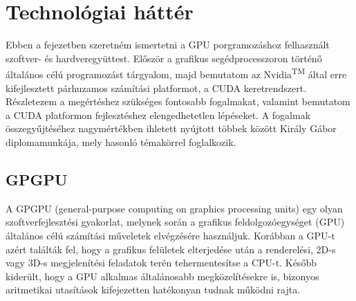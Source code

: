 \chapter{Technológiai háttér} \label{technologyChapter}
Ebben a fejezetben szeretném ismertetni a GPU porgramozáshoz felhasznált szoftver- és hardveregyüttest. Először a grafikus segédprocesszoron történő általános célú programozást tárgyalom, majd bemutatom az Nvidia\textsuperscript{TM} által erre kifejlesztett párhuzamos számítási platformot, a CUDA keretrendszert. Részletezem a megértéshez szükséges fontosabb fogalmakat, valamint bemutatom a CUDA platformon fejlesztéshez elengedhetetlen lépéseket. A fogalmak összegyűjtéséhez nagymértékben ihletett nyújtott többek között Király Gábor diplomamunkája, mely hasonló témakörrel foglalkozik. \cite{kvantum_optim}

\section{GPGPU}
A GPGPU (general-purpose computing on graphics processing units) egy olyan
szoftverfejlesztési gyakorlat, melynek során a grafikus feldolgozóegységet (GPU) általános
célú számítási műveletek elvégzésére használjuk. \cite{kvantum_optim} Korábban a GPU-t azért találták fel, hogy a grafikus felületek elterjedése után a renderelési, 2D-s vagy 3D-s megjelenítési feladatok terén tehermentesítse a CPU-t. Később kiderült, hogy a GPU alkalmas általánosabb megközelítésekre is, bizonyos aritmetikai utasítások kifejezetten hatékonyan tudnak működni rajta.

